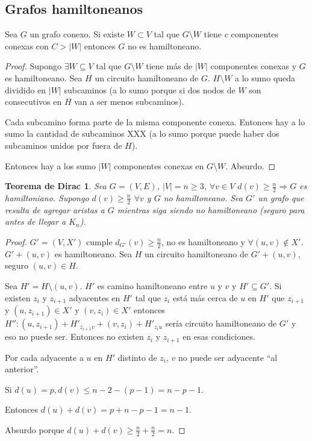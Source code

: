 \subsection{Grafos hamiltoneanos}

\begin{teo}
    Sea $G$ un grafo conexo. Si existe $W \subset V$ tal que $G \setminus W$ tiene $c$ componentes conexas con $C > |W|$ entonces $G$ no es hamiltoneano.
\end{teo}

\begin{proof}
Supongo $\exists W \subseteq V$ tal que $G \setminus W$ tiene más de $|W|$ componentes conexas y $G$ es hamiltoneano. Sea $H$ un circuito hamiltoneano de $G$. $H \setminus W$ a lo sumo queda dividido en $|W|$ subcaminos (a lo sumo porque si dos nodos de $W$ son consecutivos en $H$ van a ser menos subcaminos).

Cada subcamino forma parte de la misma componente conexa. Entonces hay a lo sumo la cantidad de subcaminos XXX (a lo sumo porque puede haber dos subcaminos unidos por fuera de $H$).

Entonces hay a los sumo $|W|$ componentes conexas en $G \setminus W$. Absurdo.
\end{proof}

\newtheorem*{Dirac}{Teorema de Dirac}
\begin{Dirac}
Sea $G = (V, E)$, $|V| = n \geq 3$, $\forall v \in V$ $d(v) \geq \frac{n}{2} \Longrightarrow G$ es hamiltoniano.
Supongo $d(v) \geq \frac{n}{2}$ $\forall v$ y $G$ no hamiltoneano. Sea $G'$ un grafo que resulta de agregar aristas a $G$ mientras siga siendo no hamiltoneano (seguro para antes de llegar a $K_n$). 
\end{Dirac}

\begin{proof}
$G' = (V, X')$ cumple $d_{G'}(v) \geq \frac{n}{2}$, no es hamiltoneano y $\forall (u, v) \notin X'$. $G' + (u, v)$ es hamiltoneano. Sea $H$ un circuito hamiltoneano de $G' + (u, v)$, seguro $(u, v) \in H$.

Sea $H' = H \setminus (u, v)$. $H'$ es camino hamiltoneano entre $u$ y $v$ y $H' \subseteq G'$. Si existen $z_i$ y $z_{i+1}$ adyacentes en $H'$ tal que $z_i$ está más cerca de $u$ en $H'$ que $z_{i+1}$ y $(u, z_{i+1}) \in X'$ y $(v, z_i) \in X'$ entonces $H'' : (u, z_{i+1}) + H'_{z_{i+1}v} + (v, z_i) + H'_{z_iu}$ sería circuito hamiltoneano de $G'$ y eso no puede ser. Entonces no existen $z_i$ y $z_{i+1}$ en esas condiciones.

Por cada adyacente a $u$ en $H'$ distinto de $z_i$, $v$ no puede ser adyacente ``al anterior''.

Si $d(u) = p, d(v) \leq n - 2 - (p - 1) = n - p - 1$.

Entonces $d(u) + d(v) = p + n - p - 1 = n - 1$.

Absurdo porque $d(u) + d(v) \geq \frac{n}{2} + \frac{n}{2} = n$.
\end{proof}

